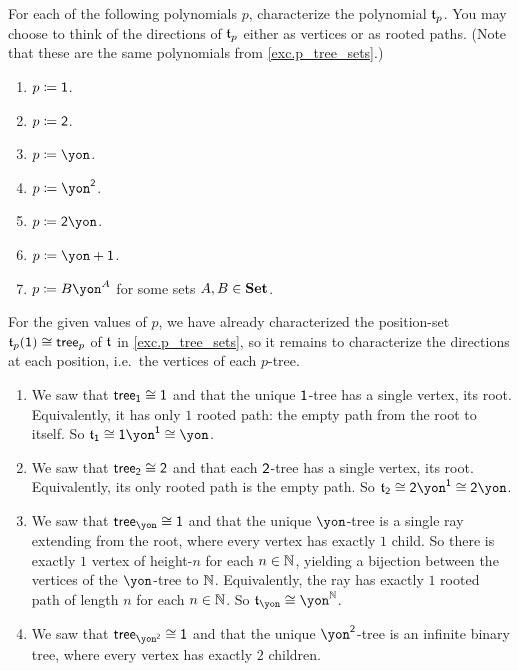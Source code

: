 \documentclass[Book-Poly]{subfiles}
\begin{document}
\begin{exercise}\label{exc.p_tree_polys}
For each of the following polynomials $p$, characterize the polynomial $\mathfrak{t}_p$.
You may choose to think of the directions of $\mathfrak{t}_p$ either as vertices or as rooted paths.
(Note that these are the same polynomials from \cref{exc.p_tree_sets}.)
\begin{enumerate}
	\item \label{exc.p_tree_polys.1} $p\coloneqq\textsf{1}$.
	\item $p\coloneqq\textsf{2}$.
	\item \label{exc.p_tree_polys.unary} $p\coloneqq\yon$.
	\item \label{exc.p_tree_polys.binary} $p\coloneqq\yon^\2$.
	\item \label{exc.p_tree_polys.2_label_ray} $p\coloneqq{\2\yon}$.
	\item \label{exc.p_tree_polys.maybe_unary} $p\coloneqq{\yon+\1}$.
	\item \label{exc.p_tree_polys.monomial} $p\coloneqq{B\yon^A}$ for some sets $A,B\in\mathbf{Set}$.
\qedhere
\end{enumerate}
\begin{solution}
For the given values of $p$, we have already characterized the position-set $\mathfrak{t}_p(\textsf{1})\cong\mathsf{tree}_p$ of $\mathfrak{t}$ in \cref{exc.p_tree_sets}, so it remains to characterize the directions at each position, i.e.\ the vertices of each $p$-tree.
\begin{enumerate}
    \item We saw that $\mathsf{tree}_{\textsf{1}}\cong\textsf{1}$ and that the unique $\textsf{1}$-tree has a single vertex, its root.
    Equivalently, it has only $1$ rooted path: the empty path from the root to itself.
    So $\car{t}_\1\iso\1\yon^\1\iso\yon$.
    \item We saw that $\mathsf{tree}_{\textsf{2}}\cong\textsf{2}$ and that each $\textsf{2}$-tree has a single vertex, its root.
    Equivalently, its only rooted path is the empty path.
    So $\car{t}_\2\iso\2\yon^\1\iso\2\yon$.
    \item We saw that $\tr_\yon\iso\1$ and that the unique $\yon$-tree is a single ray extending from the root, where every vertex has exactly $1$ child.
    So there is exactly $1$ vertex of height-$n$ for each $n\in\mathbb{N}$, yielding a bijection between the vertices of the $\yon$-tree to $\mathbb{N}$.
    Equivalently, the ray has exactly $1$ rooted path of length $n$ for each $n\in\mathbb{N}$.
    So $\car{t}_\yon\iso\yon^\nn$.
    \item We saw that $\tr_{\yon^\2}\iso\1$ and that the unique $\yon^\2$-tree is an infinite binary tree, where every vertex has exactly $2$ children.

\end{enumerate}
\end{solution}
\end{exercise}
\end{document}
